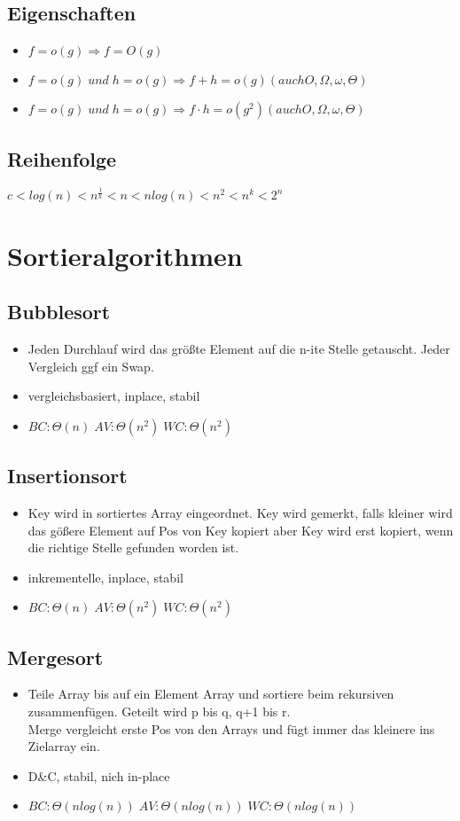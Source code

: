 \documentclass{article}
\begin{document}
\subsection{Eigenschaften}
\begin{itemize}
\item $f = o(g) \Rightarrow f = O(g)$
\item $f = o(g) \; und \;  h = o(g) \Rightarrow f+h = o(g) (auch O, \Omega, \omega, \Theta)$
\item $f = o(g) \; und \;  h = o(g) \Rightarrow f\cdot h = o(g^2) (auch O, \Omega, \omega, \Theta)$
\end{itemize}
\subsection{Reihenfolge}
$c < log(n) < n^{\frac{1}{k}} < n < n log(n) < n^2 < n^k < 2^n$
\section{Sortieralgorithmen}
\subsection {Bubblesort}
\begin{itemize}
\item Jeden Durchlauf wird das gr{\"o}\ss te Element auf die n-ite Stelle getauscht. Jeder Vergleich ggf ein Swap.
\item vergleichsbasiert, inplace, stabil
\item $BC: \Theta(n)\; AV: \Theta(n^2) \; WC: \Theta(n^2)$
\end{itemize}

\subsection{Insertionsort}
\begin{itemize}
\item Key wird in sortiertes Array eingeordnet. Key wird gemerkt, falls kleiner wird das g{\"o}\ss ere Element auf Pos von Key kopiert aber Key wird erst kopiert, wenn die richtige Stelle gefunden worden ist.
\item inkrementelle, inplace, stabil
\item $BC: \Theta(n)\; AV: \Theta(n^2) \; WC: \Theta(n^2)$ 
\end{itemize}

\subsection{Mergesort}
\begin{itemize}
\item Teile Array bis auf ein Element Array und sortiere beim rekursiven zusammenf{\"u}gen. Geteilt wird p bis q, q+1 bis r. \\
Merge vergleicht erste Pos von den Arrays und f{\"u}gt immer das kleinere ins Zielarray ein.
\item D\&C, stabil, nich in-place
\item $BC: \Theta(nlog(n))\; AV:\Theta(nlog(n))\; WC: \Theta(nlog(n))\;$
\end{itemize}
\end{document}

